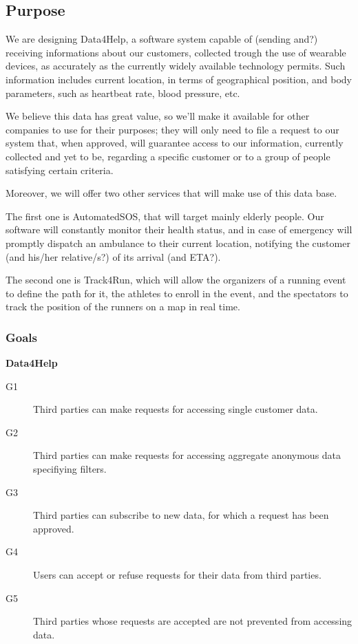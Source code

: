 \documentclass[../main.tex]{subfiles}
\begin{document}
\vspace{8mm}
\subsection{Purpose}

We are designing Data4Help, a software system capable of (sending and?) receiving informations about our customers, collected trough the use of wearable devices, as accurately as the currently widely available technology permits.
Such information includes current location, in terms of geographical position, and body parameters, such as heartbeat rate, blood pressure, etc.

We believe this data has great value, so we'll make it available for other companies to use for their purposes; they will only need to file a request to our system that, when approved, will guarantee access to our information, currently collected and yet to be, regarding a specific customer or to a group of people satisfying certain criteria.

Moreover, we will offer two other services that will make use of this data base.

The first one is AutomatedSOS, that will target mainly elderly people. Our software will constantly monitor their health status, and in case of emergency will promptly dispatch an ambulance to their current location, notifying the customer (and his/her relative/s?) of its arrival (and ETA?).

The second one is Track4Run, which will allow the organizers of a running event to define the path for it, the athletes to enroll in the event, and the spectators to track the position of the runners on a map in real time.


\vspace{8mm}
\subsubsection{Goals}

\vspace{2mm}
{\bf Data4Help}
\begin{description}
	\item [G1]  Third parties can make requests for accessing single customer data.
	\item [G2]  Third parties can make requests for accessing aggregate anonymous data specifiying filters.
	\item [G3]  Third parties can subscribe to new data, for which a request has been approved.
	\item [G4]  Users can accept or refuse requests for their data from third parties.
	\item [G5]  Third parties whose requests are accepted are not prevented from accessing data.
\end{description}
\end{document}

